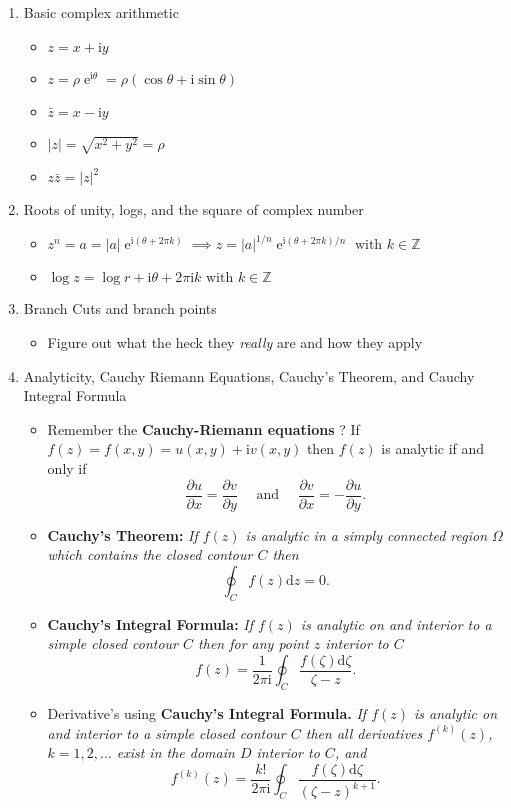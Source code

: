 \documentclass[10pt]{amsart}
\newcommand{\D}{\mathrm{d}}
\newcommand{\I}{\mathrm{i}}
\DeclareMathOperator{\E}{e}
\theoremstyle{nonumberplain}
\begin{document}
\begin{enumerate}[label={\bf {\arabic*}:}]
\item Basic complex arithmetic
\begin{itemize}
\item $z = x + \I y$
\item $z = \rho \E^{\I \theta} = \rho ( \cos \theta + \I \sin \theta )$
\item $\bar z = x - \I y$
\item $|z| = \sqrt{x^2 + y^2} = \rho$
\item $z \bar z = |z|^2$ \\
\end{itemize}

\item Roots of unity, logs, and the square of complex number
\begin{itemize}
\item $z^n = a = |a|\E^{\I (\theta + 2 \pi k)} \implies
	z = |a|^{1/n}\E^{\I(\theta + 2 \pi k)/n} \text{ with } k \in \mathbb Z$
\item $\log z = \log r + \I \theta + 2 \pi \I k \text{ with } k \in \mathbb Z$ \\
\end{itemize}

\item Branch Cuts and branch points
\begin{itemize}
\item Figure out what the heck they \textit{really} are and how they apply \\
\end{itemize}

\item Analyticity, Cauchy Riemann Equations, Cauchy's Theorem, and Cauchy Integral Formula
\begin{itemize}
\item Remember the { \bf Cauchy-Riemann equations }? If $f(z) = f(x,y) = u(x, y) + \I v(x,y)$ then $f(z)$ is analytic if and only if $$\frac{\partial u}{\partial x} = \frac{\partial v}{\partial y} \quad \text{ and } \quad \frac{\partial v}{\partial x} = - \frac{\partial u}{\partial y}.$$
\item \textbf{Cauchy's Theorem:} {\it If $f(z)$ is analytic in a simply connected region $\Omega$ which contains the closed contour $C$ then $$ \oint_C f(z) \D z = 0. $$}
\item \textbf{Cauchy's Integral Formula:} {\it If $f(z)$ is analytic on and interior to a simple closed contour $C$ then for any point $z$ interior to $C$ $$f(z) = \frac 1 {2 \pi \I}\oint_C \frac {f(\zeta) \D \zeta}{\zeta - z}. $$}
\item Derivative's using \textbf{Cauchy's Integral Formula.} {\it If $f(z)$ is analytic on and interior to a simple closed contour $C$ then all derivatives $f^{(k)}(z)$, $k = 1, 2, ...$ exist in the domain $D$ interior to $C$, and $$f^{(k)}(z) = \frac {k!} {2 \pi \I}\oint_C \frac {f(\zeta) \D \zeta}{(\zeta - z)^{k + 1}}. $$} \\
\end{itemize}


\end{enumerate}
\end{document}
